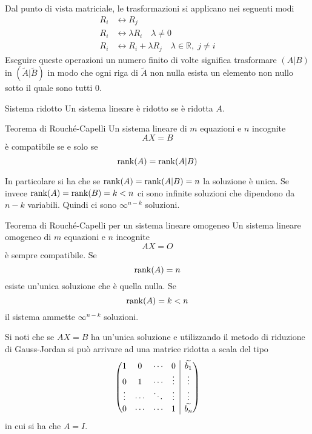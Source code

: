 Dal punto di vista matriciale, le trasformazioni si applicano nei seguenti modi
\begin{align*}
  R_i &\leftrightarrow R_j\\
  R_i &\leftrightarrow \lambda R_i\quad\lambda\neq0\\
  R_i &\leftrightarrow R_i+\lambda R_j\quad\lambda\in\mathbb{R},\;j\neq i
\end{align*}
Eseguire queste operazioni un numero finito di volte significa trasformare $(A\vert B)$
in $(\widetilde{A}\vert\widetilde{B})$ in modo che ogni riga di $\widetilde{A}$ non
nulla esista un elemento non nullo sotto il quale sono tutti $0$.

\begin{Def}{Sistema ridotto}
  Un sistema lineare è ridotto se è ridotta $A$.
\end{Def}

\begin{Thm}{Teorema di Rouché-Capelli}\label{thm:lineare_rouche-capelli}
  Un sistema lineare di $m$ equazioni e $n$ incognite
  \begin{equation*}
    AX = B
  \end{equation*}
  è compatibile se e solo se
  \begin{equation*}
    \rank(A) = \rank(A\vert B)
  \end{equation*}
\end{Thm}

In particolare si ha che se $\rank(A)=\rank(A\vert B)=n$ la soluzione è unica. Se invece
$\rank(A)=\rank(B)=k<n$ ci sono infinite soluzioni che dipendono da $n-k$ variabili.
Quindi ci sono $\infty^{n-k}$ soluzioni.

\begin{SubThm}{Teorema di Rouché-Capelli per un sistema lineare omogeneo}
  Un sistema lineare omogeneo di $m$ equazioni e $n$ incognite
  \begin{equation*}
    AX = O
  \end{equation*}
  è sempre compatibile. Se
  \begin{equation*}
    \rank(A) = n
  \end{equation*}
  esiste un'unica soluzione che è quella nulla. Se
  \begin{equation*}
    \rank(A) = k < n
  \end{equation*}
  il sistema ammette $\infty^{n-k}$ soluzioni.
\end{SubThm}

Si noti che se $AX=B$ ha un'unica soluzione e utilizzando il metodo di riduzione di
Gauss-Jordan si può arrivare ad una matrice ridotta a scala del tipo
\begin{equation*}
  \left(
    \begin{array}{@{}cccc|c@{}}
      1 & 0 & \cdots & 0 & \widetilde{b_1}\\
      0 & 1 & \cdots & \vdots & \vdots\\
      \vdots & \cdots & \ddots & \vdots & \vdots\\
      0 & \cdots & \cdots & 1 & \widetilde{b_n}
    \end{array}
  \right)
\end{equation*}
in cui si ha che $A=I$.
